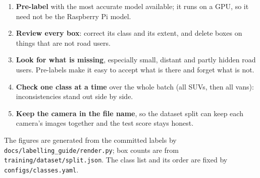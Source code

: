 \documentclass[11pt,a4paper]{article}
\begin{document}
\begin{enumerate}[leftmargin=*,label=\textbf{\arabic*.}]
  \item \textbf{Pre-label} with the most accurate model available; it runs on a GPU, so it
    need not be the Raspberry Pi model.
  \item \textbf{Review every box}: correct its class and its extent, and delete boxes on
    things that are not road users.
  \item \textbf{Look for what is missing}, especially small, distant and partly hidden road
    users. Pre-labels make it easy to accept what is there and forget what is not.
  \item \textbf{Check one class at a time} over the whole batch (all SUVs, then all vans):
    inconsistencies stand out side by side.
  \item \textbf{Keep the camera in the file name}, so the dataset split can keep each
    camera's images together and the test score stays honest.
\end{enumerate}

\vfill
{\small\color{black!60} The figures are generated from the committed labels by
\texttt{docs/labelling\_guide/render.py}; box counts are from
\texttt{training/dataset/split.json}. The class list and its order are fixed by
\texttt{configs/classes.yaml}.}
\end{document}

